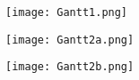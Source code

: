 \begin{figure}[H]
    \centering
    \texttt{[image: Gantt1.png]}
\end{figure}

\begin{figure}[H]
    \centering
    \texttt{[image: Gantt2a.png]}
\end{figure}

\begin{figure}[H]
    \centering
    \texttt{[image: Gantt2b.png]}
\end{figure}